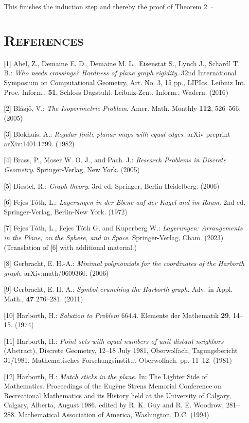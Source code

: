 \documentclass{article}
\begin{document}
This finishes the induction step and thereby the proof of Theorem 2. \hfill$\square$

\section*{\textsc{References}}

\begin{hangpars}

[1] Abel, Z., Demaine E. D., Demaine M. L., Eisenstat S., Lynch J., Schardl T. B.: \textit{Who needs crossings? Hardness of plane graph rigidity}. 32nd International Symposium on Computational Geometry, Art. No. 3, 15 pp., LIPIcs. Leibniz Int. Proc. Inform., \textbf{51}, Schloss Dagstuhl. Leibniz-Zent. Inform., Wadern. (2016)

[2] Blåsjö, V.: \textit{The Isoperimetric Problem}. Amer. Math. Monthly \textbf{112}, 526–566. (2005)

[3] Blokhuis, A.: \textit{Regular finite planar maps with equal edges}. arXiv preprint arXiv:1401.1799. (1982)

[4] Brass, P., Moser W. O. J., and Pach. J.: \textit{Research Problems in Discrete Geometry}. Springer-Verlag, New York. (2005)

[5] Diestel, R.: \textit{Graph theory}. 3rd ed. Springer, Berlin Heidelberg. (2006)

[6] Fejes Tóth, L.: \textit{Lagerungen in der Ebene auf der Kugel und im Raum}. 2nd ed. Springer-Verlag, Berlin-New York. (1972)

[7] Fejes Tóth, L., Fejes Tóth G, and Kuperberg W.: \textit{Lagerungen: Arrangements in the Plane, on the Sphere, and in Space}. Springer-Verlag, Cham. (2023) (Translation of [6] with additional material.)

[8] Gerbracht, E. H.-A.: \textit{Minimal polynomials for the coordinates of the Harborth graph}. arXiv:math/0609360. (2006)

[9] Gerbracht, E. H.-A.: \textit{Symbol-crunching the Harborth graph}. Adv. in Appl. Math., \textbf{47} 276–281. (2011)

[10] Harborth, H.: \textit{Solution to Problem $664$A}. Elemente der Mathematik \textbf{29}, 14–15. (1974)

[11] Harborth, H.: \textit{Point sets with equal numbers of unit-distant neighbors} (Abstract), Discrete Geometry, 12–18 July 1981, Oberwolfach, Tagungsbericht 31/1981, Mathematisches Forschungsinstitut Oberwolfach. pp. 11–12. (1981)

[12] Harborth, H.: \textit{Match sticks in the plane}. In: The Lighter Side of Mathematics. Proceedings of the Eugène Strens Memorial Conference on Recreational Mathematics and its History held at the University of Calgary, Calgary, Alberta, August 1986. edited by R. K. Guy and R. E. Woodrow, 281–288. Mathematical Association of America, Washington, D.C. (1994)


\end{hangpars}
\end{document}
